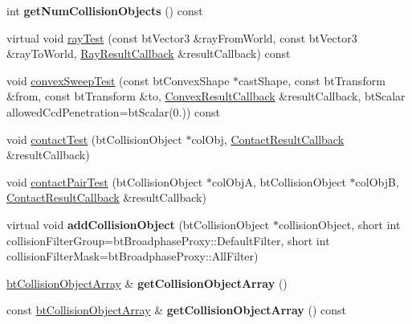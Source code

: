 \begin{DoxyCompactItemize}
\item 
\mbox{\label{classbtCollisionWorld_a6d4cc6533d174d1ae57d4907cdcf227e}} 
int {\bfseries get\+Num\+Collision\+Objects} () const
\item 
virtual void \hyperlink{classbtCollisionWorld_aad7854427ebb72ec77d32a6a2d458504}{ray\+Test} (const bt\+Vector3 \&ray\+From\+World, const bt\+Vector3 \&ray\+To\+World, \hyperlink{structbtCollisionWorld_1_1RayResultCallback}{Ray\+Result\+Callback} \&result\+Callback) const
\item 
void \hyperlink{classbtCollisionWorld_a8dcdf201fe1c98c633682cf3845d237f}{convex\+Sweep\+Test} (const bt\+Convex\+Shape $\ast$cast\+Shape, const bt\+Transform \&from, const bt\+Transform \&to, \hyperlink{structbtCollisionWorld_1_1ConvexResultCallback}{Convex\+Result\+Callback} \&result\+Callback, bt\+Scalar allowed\+Ccd\+Penetration=bt\+Scalar(0.)) const
\item 
void \hyperlink{classbtCollisionWorld_ae1d167b53de82d4f97a47118f8480999}{contact\+Test} (bt\+Collision\+Object $\ast$col\+Obj, \hyperlink{structbtCollisionWorld_1_1ContactResultCallback}{Contact\+Result\+Callback} \&result\+Callback)
\item 
void \hyperlink{classbtCollisionWorld_aabbec542dcd348041db6d07b36a640c8}{contact\+Pair\+Test} (bt\+Collision\+Object $\ast$col\+ObjA, bt\+Collision\+Object $\ast$col\+ObjB, \hyperlink{structbtCollisionWorld_1_1ContactResultCallback}{Contact\+Result\+Callback} \&result\+Callback)
\item 
\mbox{\label{classbtCollisionWorld_a822b2ad559bb433158f1dcad3c28165d}} 
virtual void {\bfseries add\+Collision\+Object} (bt\+Collision\+Object $\ast$collision\+Object, short int collision\+Filter\+Group=bt\+Broadphase\+Proxy\+::\+Default\+Filter, short int collision\+Filter\+Mask=bt\+Broadphase\+Proxy\+::\+All\+Filter)
\item 
\mbox{\label{classbtCollisionWorld_a43e878669b2e755992acc41fad1cda30}} 
\hyperlink{classbtAlignedObjectArray}{bt\+Collision\+Object\+Array} \& {\bfseries get\+Collision\+Object\+Array} ()
\item 
\mbox{\label{classbtCollisionWorld_a4c4afa92446d6732ee124c4adcb646fb}} 
const \hyperlink{classbtAlignedObjectArray}{bt\+Collision\+Object\+Array} \& {\bfseries get\+Collision\+Object\+Array} () const

\end{DoxyCompactItemize}
